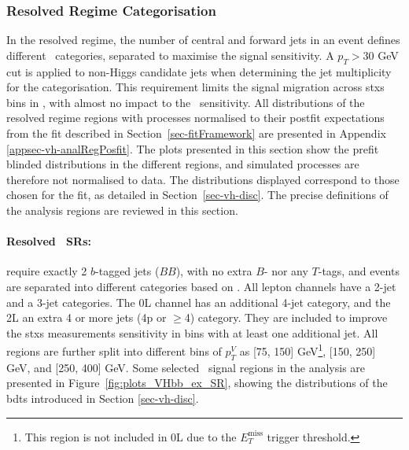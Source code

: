 \subsubsection{Resolved Regime Categorisation}
In the resolved regime, the number of central and forward jets in an event defines different \nj\ categories, separated to maximise the signal sensitivity. A $p_T > 30$ GeV cut is applied to non-Higgs candidate jets when determining the jet multiplicity for the categorisation. This requirement limits the signal migration across \gls{stxs} bins in \vhb, with almost no impact to the \vhc\ sensitivity. All distributions of the resolved regime regions with processes normalised to their postfit expectations from the fit described in Section~\ref{sec-fitFramework} are presented in Appendix \ref{appsec-vh-analRegPosfit}. The plots presented in this section show the prefit blinded distributions in the different regions, and simulated processes are therefore not normalised to data. The distributions displayed correspond to those chosen for the fit, as detailed in Section~\ref{sec-vh-disc}. The precise definitions of the analysis regions are reviewed in this section.

\paragraph{Resolved \boldvhb\ SRs:} require exactly 2 $b$-tagged jets ($BB$), with no extra $B$- nor any $T$-tags, and events are separated into different categories based on \nj. All lepton channels have a 2-jet and a 3-jet categories. The 0L channel has an additional 4-jet category, and the 2L an extra 4 or more jets (4p or $\geq$4) category. They are included to improve the \gls{stxs} measurements sensitivity in bins with at least one additional jet. All regions are further split into different bins of $p_T^V$ as [75, 150] GeV\footnote{This region is not included in 0L due to the $E_T^{\textrm{miss}}$ trigger threshold.}, [150, 250] GeV, and [250, 400] GeV. Some selected \vhb\ signal regions in the analysis are presented in Figure~\ref{fig:plots_VHbb_ex_SR}, showing the distributions of the \glspl{bdt} introduced in Section \ref{sec-vh-disc}. 

